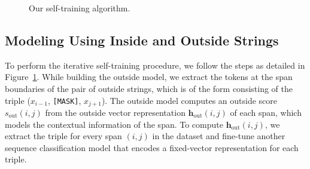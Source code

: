 \documentclass[11pt]{article}
\begin{document}
\begin{figure}[t]
\centering
\begin{small}
\end{small}
\caption[Our self-training algorithm]{Our self-training algorithm.}
\label{fig:our-self-training-algo}
\end{figure} 
\subsection{Modeling Using Inside and Outside Strings}
\label{ssec:inside-outside-algorithm}
 To perform the iterative self-training procedure, we follow the steps as detailed in Figure~\ref{fig:our-self-training-algo}. While building the outside model, we extract the tokens at the span boundaries of the pair of outside strings, which is of the form consisting of the triple ($x_{i-1}$, \texttt{[MASK]}, $x_{j+1}$). The outside model computes an outside score $s_{\text{out}}{(i,j)}$ from the outside vector representation ${\boldsymbol{h}_{\text{out}}(i,j)}$ of each span, which models the contextual information of the span. To compute ${\boldsymbol{h}_{\text{out}}(i,j)}$, we extract the triple for every span $(i,j)$ in the dataset and fine-tune another sequence classification model that encodes a fixed-vector representation for each triple.
\end{document}
